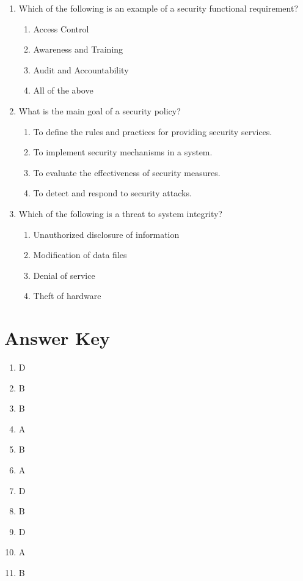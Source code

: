 \documentclass{article}
\begin{document}
\begin{enumerate}
    \item Which of the following is an example of a security functional requirement?
    \begin{enumerate}
        \item Access Control
        \item Awareness and Training
        \item Audit and Accountability
        \item All of the above
    \end{enumerate}
    
    \item What is the main goal of a security policy?
    \begin{enumerate}
        \item To define the rules and practices for providing security services.
        \item To implement security mechanisms in a system.
        \item To evaluate the effectiveness of security measures.
        \item To detect and respond to security attacks.
    \end{enumerate}
    
    \item Which of the following is a threat to system integrity?
    \begin{enumerate}
        \item Unauthorized disclosure of information
        \item Modification of data files
        \item Denial of service
        \item Theft of hardware
    \end{enumerate}
    \end{enumerate}
    
    
\newpage
\section*{Answer Key}
\begin{enumerate}
    \item D
    \item B
    \item B
    \item A
    \item B
    \item A
    \item D
    \item B
    \item D
    \item A
    \item B
    
\end{enumerate}
\end{document}
